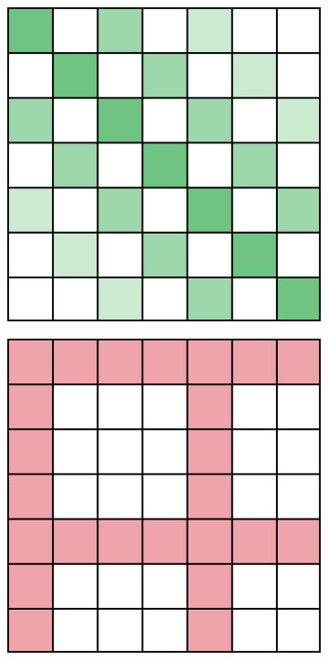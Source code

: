 \begin{figure}
\begin{subfigure}{0.15\textwidth}
        \caption{}\label{fig:attn_pattern_local}
    \end{subfigure}
    \begin{subfigure}{0.15\textwidth}
        \centering
        \includegraphics[width=\textwidth]{./img/local_strided_attention.png}
        \caption{}\label{fig:attn_pattern_dilated_local}
    \end{subfigure}
    \begin{subfigure}{0.15\textwidth}
        \centering
        \includegraphics[width=\textwidth]{./img/global_attention.png}

\end{subfigure}
\end{figure}
